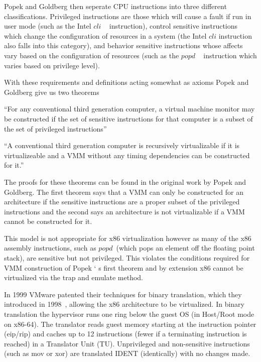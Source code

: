 Popek and Goldberg then seperate CPU instructions into three different classifications.  Privileged instructions are those which will cause a fault if run in user mode (such as the Intel $cli$ ~\cite{_intel_2015} instruction), control sensitive instructions which change the configuration of resources in a system (the Intel $cli$ instruction also falls into this category),  and behavior sensitive instructions whose affects vary based on the configuration of resources (such as the $popd$ ~\cite{_intel_2015} instruction which varies based on privilege level).

With these requirements and definitions acting somewhat as axioms Popek and Goldberg give us two theorems ~\cite{popek_formal_1974}



 \begin{theorem}
 \label{Popek I}
 {
 ``For any conventional third generation computer, a virtual machine monitor may be constructed if the set of sensitive instructions for that computer is a subset of the set of privileged instructions'' ~\cite{popek_formal_1974}
 }
 \end{theorem}


\begin{theorem}
 \label{Popek II}
 {
 ``A conventional third generation computer is recursively virtualizable if it is virtualizeable and a VMM without any timing dependencies can be constructed for it.'' ~\cite{popek_formal_1974}
 }
 \end{theorem}



The proofs for these theorems can be found in the original work by Popek and Goldberg. The first theorem says that a VMM can only be constructed for an architecture if the sensitive instructions are a proper subset of the privileged instructions and the second says an architecture is not virtualizable if a VMM cannot be constructed for it.  

This model is not appropriate for x86 virtualization however as many of the x86 assembly instructions, such as $popd$~\cite{_intel_2015}(which pops an element off the floating point stack),  are sensitive but not privileged. This violates the conditions required for VMM construction of Popek ` s first theorem and by extension x86 cannot be virtualized via the trap and emulate method. 

In 1999 VMware patented their techniques for binary translation, which they introduced in 1998~\cite{rosenblum_vmwareas_1999}, allowing the x86 architecture to be virtualized.  In binary translation the hypervisor runs one ring below the guest OS (in Host/Root mode on x86-64).  The translator reads guest memory starting at the instruction pointer (eip/rip) and caches up to 12 instructions (fewer if a terminating instruction is reached) in a Translator Unit (TU). Unprivileged and non-sensitive instructions (such as mov or xor) are translated IDENT (identically) with no changes made. 

